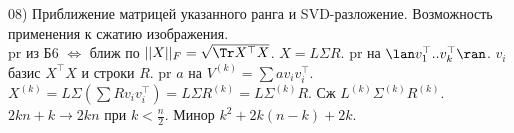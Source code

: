 08) Приближение матрицей указанного ранга и SVD-разложение. Возможность применения к сжатию изображения.\\

pr из Б6 $\Leftrightarrow$ ближ по $||X||_F = \sqrt{\Tr X^{\top}X}$. $X = L\Sigma R$. pr на $\lan v_1^{\top}..v_k^{\top} \ran$. $v_i$ базис $X^{\top}X$ и строки $R$. pr $a$ на $V^{(k)} = \sum av_iv_i^{\top}$. $X^{(k)} = L\Sigma(\sum Rv_iv_i^{\top}) = L\Sigma R^{(k)} = L\Sigma^{(k)}R$. Сж $L^{(k)}\Sigma^{(k)}R^{(k)}$. $2kn +k \to 2kn$ при $k < \frac{n}{2}$. Минор $k^2 + 2k(n-k) + 2k$.
